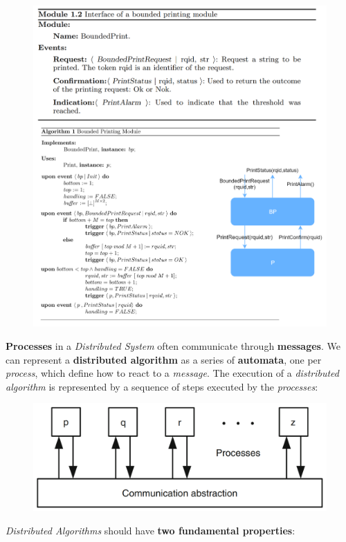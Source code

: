 \documentclass{article}
\begin{document}
\begin{figure}[H]
  \centering
  \includegraphics[scale=0.62, left]{cattura7.png}
\end{figure}
\hfill\break
\textbf{Processes} in a \emph{Distributed System} often communicate through \textbf{messages}. We can represent a \textbf{distributed algorithm} as a series of \textbf{automata}, one per \emph{process}, which define how to react to a \emph{message}. The execution of a \emph{distributed algorithm} is represented by a sequence of steps executed by the \emph{processes}: 
\begin{figure}[H]
  \centering
  \includegraphics[scale=0.62]{cattura8.png}
\end{figure}
\emph{Distributed Algorithms} should have \textbf{two fundamental properties}:
\end{document}
